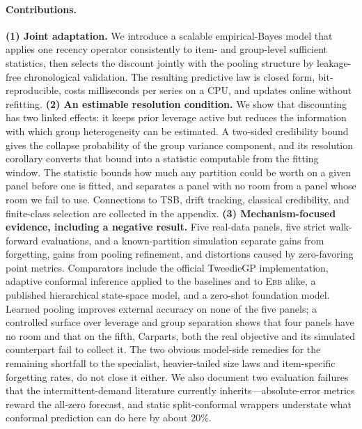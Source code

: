 \documentclass[twoside]{article}
\theoremstyle{definition}
\newcommand{\EBB}{\textsc{Ebb}}
\begin{document}
\paragraph{Contributions.}
\textbf{(1) Joint adaptation.} We introduce a scalable empirical-Bayes
model that applies one recency operator consistently to item- and
group-level sufficient statistics, then selects the discount jointly with
the pooling structure by leakage-free chronological validation. The
resulting predictive law is closed form, bit-reproducible, costs
milliseconds per series on a CPU, and updates online without refitting.
\textbf{(2) An estimable resolution condition.} We show that discounting
has two linked effects: it keeps prior leverage active but reduces the
information with which group heterogeneity can be estimated. A two-sided
credibility bound gives the collapse probability of the group variance
component, and its resolution corollary converts that bound into a
statistic computable from the fitting window. The statistic bounds how
much any partition could be worth on a given panel before one is fitted,
and separates a panel with no room from a panel whose room we fail to use.
Connections to TSB, drift tracking, classical credibility, and
finite-class selection are collected in the appendix.
\textbf{(3) Mechanism-focused evidence, including a negative result.}
Five real-data panels, five strict walk-forward evaluations, and a
known-partition simulation separate gains from forgetting, gains from
pooling refinement, and distortions caused by zero-favoring point metrics.
Comparators include the official TweedieGP implementation, adaptive
conformal inference applied to the baselines and to \EBB{} alike, a
published hierarchical state-space model, and a zero-shot foundation
model. %
Learned pooling improves external accuracy on
none of the five panels; a controlled surface over leverage and group
separation shows that four panels have no room and that on the fifth,
Carparts, both the real objective and its simulated counterpart fail to
collect it. The two obvious model-side remedies for the remaining shortfall to
the specialist, heavier-tailed size laws and item-specific forgetting
rates, do not close it either. We also document two evaluation failures that the
intermittent-demand literature currently inherits---absolute-error metrics
reward the all-zero forecast, and static split-conformal wrappers
understate what conformal prediction can do here by about $20\%$.
\end{document}
